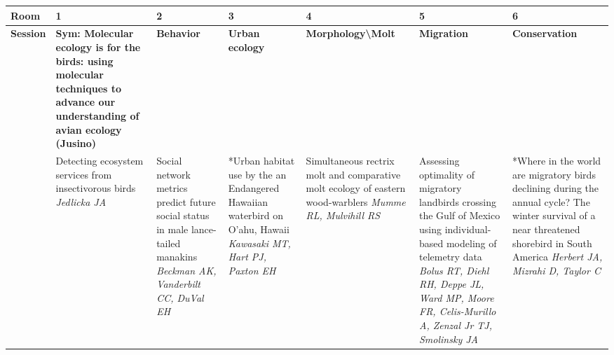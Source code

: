 \begin{tabular}{|x{0.75cm}|a{2.25cm}|x{2.25cm}|x{2.25cm}|x{2.25cm}|x{2.25cm}|x{2.25cm}|}\hline
Room & 1 & 2 & 3 & 4 & 5 & 6\\
\hline
\rule{0pt}{1em} \textbf{Session} &\footnotesize \textbf{Sym: Molecular ecology is for the birds: using molecular techniques to advance our understanding of avian ecology (Jusino)} & \footnotesize \textbf{Behavior} & \footnotesize \textbf{Urban ecology} & \footnotesize \textbf{Morphology\textbackslash Molt} & \footnotesize \textbf{Migration} & \footnotesize \textbf{Conservation}\\
\hline
{}&Detecting ecosystem services from insectivorous birds \newline \newline \textit{Jedlicka JA} & Social network metrics predict future social status in male lance-tailed manakins \newline \newline \textit{Beckman AK, Vanderbilt CC, DuVal EH} & *Urban habitat use by the an Endangered Hawaiian waterbird on O'ahu, Hawaii \newline \newline \textit{Kawasaki MT, Hart PJ, Paxton EH} & Simultaneous rectrix molt and comparative molt ecology of eastern wood-warblers \newline \newline \textit{Mumme RL, Mulvihill RS} & Assessing optimality of migratory landbirds crossing the Gulf of Mexico using individual-based modeling of telemetry data \newline \newline \textit{Bolus RT, Diehl RH, Deppe JL, Ward MP, Moore FR, Celis-Murillo A, Zenzal Jr TJ, Smolinsky JA} & *Where in the world are migratory birds declining during the annual cycle? The winter survival of a near threatened shorebird in South America \newline \newline \textit{Herbert JA, Mizrahi D, Taylor C}\\
\hline

\end{tabular}
